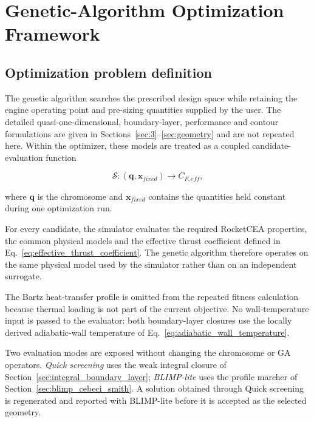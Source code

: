 
\section{Genetic-Algorithm Optimization Framework}
\label{sec:genetic_algorithm}

\subsection{Optimization problem definition}

The genetic algorithm searches the prescribed design space while retaining the engine
operating point and pre-sizing quantities supplied by the user. The detailed
quasi-one-dimensional, boundary-layer, performance and contour formulations are given
in Sections~\ref{sec:3}--\ref{sec:geometry} and are not repeated here. Within the optimizer, these models are
treated as a coupled candidate-evaluation function

\begin{equation}
\mathcal{S}:\left(\bm{q},\bm{x}_{fixed}\right)
\longrightarrow
C_{F,eff},
\label{eq:coupled_candidate_evaluator}
\end{equation}

where \(\bm{q}\) is the chromosome and \(\bm{x}_{fixed}\) contains the quantities
held constant during one optimization run.

For every candidate, the simulator evaluates the required RocketCEA properties, the
common physical models and the effective thrust coefficient defined in
Eq.~\eqref{eq:effective_thrust_coefficient}. The genetic algorithm therefore operates
on the same physical model used by the simulator rather than on an independent
surrogate.

The Bartz heat-transfer profile is omitted from the repeated fitness calculation
because thermal loading is not part of the current objective. No wall-temperature
input is passed to the evaluator: both boundary-layer closures use the locally derived
adiabatic-wall temperature of Eq.~\eqref{eq:adiabatic_wall_temperature}.

Two evaluation modes are exposed without changing the chromosome or GA operators.
\emph{Quick screening} uses the weak integral closure of
Section~\ref{sec:integral_boundary_layer}; \emph{BLIMP-lite} uses the profile marcher
of Section~\ref{sec:blimp_cebeci_smith}. A solution obtained through Quick screening
is regenerated and reported with BLIMP-lite before it is accepted as the selected
geometry.


